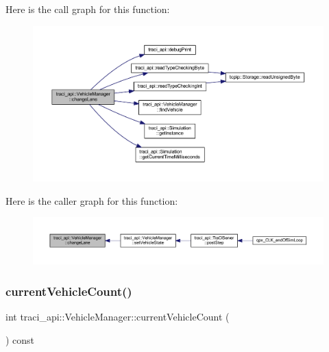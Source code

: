 Here is the call graph for this function\+:\nopagebreak
\begin{figure}[H]
\begin{center}
\leavevmode
\includegraphics[width=350pt]{classtraci__api_1_1_vehicle_manager_a5441f5ea01a06473f831ac85b9a6c70f_cgraph}
\end{center}
\end{figure}
Here is the caller graph for this function\+:\nopagebreak
\begin{figure}[H]
\begin{center}
\leavevmode
\includegraphics[width=350pt]{classtraci__api_1_1_vehicle_manager_a5441f5ea01a06473f831ac85b9a6c70f_icgraph}
\end{center}
\end{figure}
\mbox{\label{classtraci__api_1_1_vehicle_manager_a97816bd56b6f2e6949d175de86c712d6}} 
\subsubsection{\texorpdfstring{current\+Vehicle\+Count()}{currentVehicleCount()}}
{\footnotesize\ttfamily int traci\+\_\+api\+::\+Vehicle\+Manager\+::current\+Vehicle\+Count (\begin{DoxyParamCaption}{ }\end{DoxyParamCaption}) const}

